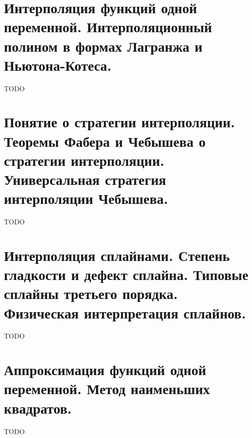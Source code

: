 \documentclass[16pt]{article}
\begin{document}
		\section{Интерполяция функций одной переменной. Интерполяционный полином в формах Лагранжа и Ньютона-Котеса.}
			TODO
			
		\section{Понятие о стратегии интерполяции. Теоремы Фабера и Чебышева о стратегии интерполяции. Универсальная стратегия интерполяции Чебышева.}
			TODO
			
		\section{Интерполяция сплайнами. Степень гладкости и дефект сплайна. Типовые сплайны третьего порядка. Физическая интерпретация сплайнов.}
			TODO
			
		\section{Аппроксимация функций одной переменной. Метод наименьших квадратов.}
			TODO
			
\end{document}
